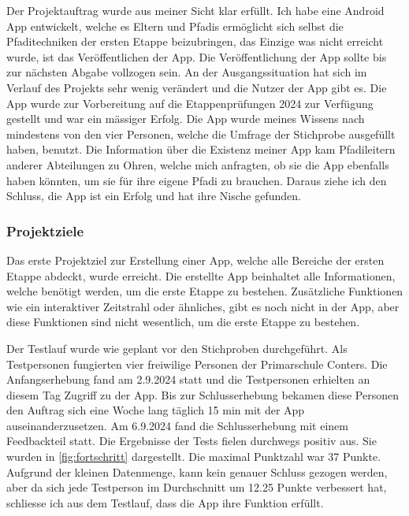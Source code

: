 Der Projektauftrag wurde aus meiner Sicht klar erfüllt. Ich habe eine Android App entwickelt, welche es Eltern und Pfadis ermöglicht sich selbst die Pfaditechniken der ersten Etappe beizubringen, das Einzige was nicht erreicht wurde, ist das Veröffentlichen der App. Die Veröffentlichung der App sollte bis zur nächsten Abgabe vollzogen sein. An der Ausgangssituation hat sich im Verlauf des Projekts sehr wenig verändert und die Nutzer der App gibt es. Die App wurde zur Vorbereitung auf die Etappenprüfungen 2024 zur Verfügung gestellt und war ein mässiger Erfolg. Die App wurde meines Wissens nach mindestens von den vier Personen, welche die Umfrage der Stichprobe ausgefüllt haben, benutzt. Die Information über die Existenz meiner App kam Pfadileitern anderer Abteilungen zu Ohren, welche mich anfragten, ob sie die App ebenfalls haben könnten, um sie für ihre eigene Pfadi zu brauchen. Daraus ziehe ich den Schluss, die App ist ein Erfolg und hat ihre Nische gefunden.

\subsubsection{Projektziele}

Das erste Projektziel zur Erstellung einer App, welche alle Bereiche der ersten Etappe abdeckt, wurde erreicht. Die erstellte App beinhaltet alle Informationen, welche benötigt werden, um die erste Etappe zu bestehen. Zusätzliche Funktionen wie ein interaktiver Zeitstrahl oder ähnliches, gibt es noch nicht in der App, aber diese Funktionen sind nicht wesentlich, um die erste Etappe zu bestehen. \par
Der Testlauf wurde wie geplant vor den Stichproben durchgeführt. Als Testpersonen fungierten vier freiwilige Personen der Primarschule Conters. Die Anfangserhebung fand am 2.9.2024 statt und die Testpersonen erhielten an diesem Tag Zugriff zu der App. Bis zur Schlusserhebung bekamen diese Personen den Auftrag sich eine Woche lang täglich 15 min mit der App auseinanderzusetzen. Am 6.9.2024 fand die Schlusserhebung mit einem Feedbackteil statt. Die Ergebnisse der Tests fielen durchwegs positiv aus. Sie wurden in \cref{fig:fortschritt} dargestellt. Die maximal Punktzahl war 37 Punkte. Aufgrund der kleinen Datenmenge, kann kein genauer Schluss gezogen werden, aber da sich jede Testperson im Durchschnitt um 12.25 Punkte verbessert hat, schliesse ich aus dem Testlauf, dass die App ihre Funktion erfüllt.

